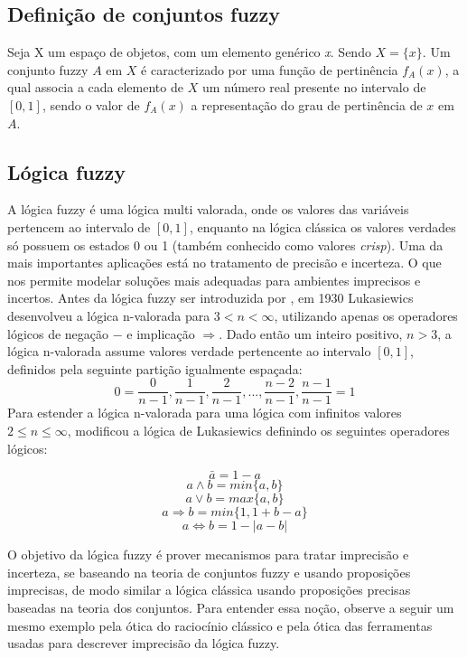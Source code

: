 \subsection{Definição de conjuntos fuzzy}

Seja X um espaço de objetos, com um elemento genérico {\it x\/}.  Sendo $X= \big\{x\big\}$.
Um conjunto fuzzy $A$ em $X$ é caracterizado por uma função de pertinência $f_A(x)$, a qual associa
a cada elemento de $X$ um número real presente no intervalo de $[0,1]$, sendo o valor de $f_A(x)$ a
representação do grau de pertinência de $x$ em $A$.

\subsection{Lógica fuzzy}

A lógica fuzzy é uma lógica multi valorada, onde os valores das variáveis pertencem ao intervalo de
$[0,1]$, enquanto na lógica clássica os valores verdades só possuem os estados 0 ou 1 (também
conhecido como valores {\it crisp\/}). Uma da mais importantes aplicações está no tratamento de
precisão e incerteza. O que nos permite modelar soluções mais adequadas para ambientes imprecisos e
incertos.  Antes da lógica fuzzy ser introduzida por , em 1930 Lukasiewics
\cite{Chen2000} desenvolveu a lógica n-valorada para $3 < n < \infty$, utilizando apenas os
operadores lógicos de negação $-$ e implicação $\Rightarrow$. Dado então um inteiro positivo, $n >
3$, a lógica n-valorada assume valores verdade pertencente ao intervalo $[0,1]$, definidos pela
seguinte partição igualmente espaçada: $$0 =  \frac{0}{n-1},
\frac{1}{n-1},\frac{2}{n-1},...,\frac{n-2}{n-1},\frac{n-1}{n-1} = 1$$ Para estender a lógica
n-valorada para uma lógica com infinitos valores $2 \leq n \leq \infty$, 
modificou a lógica de Lukasiewics definindo os seguintes operadores lógicos: 

$$\bar{a} = 1 -a$$ 
$$a \wedge b = min\{a,b\}$$ 
$$a \vee b = max\{a,b\}$$ 
$$a \Rightarrow b = min\{1, 1+b-a\}$$ 
$$a \Leftrightarrow  b = 1 - |a-b|$$

O objetivo da lógica fuzzy é prover mecanismos para tratar imprecisão e incerteza, se baseando na
teoria de conjuntos fuzzy e usando proposições imprecisas, de modo similar a lógica clássica usando
proposições precisas baseadas na teoria dos conjuntos.  Para entender essa noção, observe a seguir
um mesmo exemplo pela ótica do raciocínio clássico e pela ótica das ferramentas usadas para
descrever imprecisão da lógica fuzzy.  

